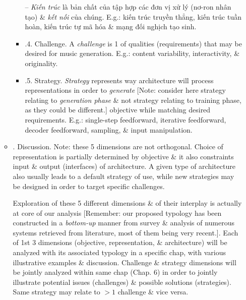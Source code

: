 \documentclass{article}
\begin{document}
\begin{itemize}
\begin{itemize}
\begin{itemize}
			-- {\it Kiến trúc} là bản chất của tập hợp các đơn vị xử lý {\it} (nơ-ron nhân tạo) \& {\it kết nối} của chúng. E.g.: kiến trúc truyền thẳng, kiến trúc tuần hoàn, kiến trúc tự mã hóa \& mạng đối nghịch tạo sinh.
			\item {.4. Challenge.} A {\it challenge} is 1 of qualities (requirements) that may be desired for music generation. E.g.: content variability, interactivity, \& originality.
			\item {.5. Strategy.} {\it Strategy} represents way architecture will process representations in order to {\it generate} [Note: consider here strategy relating to {\it generation phase} \& not strategy relating to training phase, as they could be different.] objective while matching desired requirements. E.g.: single-step feedforward, iterative feedforward, decoder feedforward, sampling, \& input manipulation.
		\end{itemize}
		\item {. Discussion.} Note: these 5 dimensions are not orthogonal. Choice of representation is partially determined by objective \& it also constraints input \& output (interfaces) of architecture. A given type of architecture also usually leads to a default strategy of use, while new strategies may be designed in order to target specific challenges.
		
		Exploration of these 5 different dimensions \& of their interplay is actually at core of our analysis [Remember: our proposed typology has been constructed in a {\it bottom-up} manner from survey \& analysis of numerous systems retrieved from literature, most of them being very recent.]. Each of 1st 3 dimensions (objective, representation, \& architecture) will be analyzed with its associated typology in a specific chap, with various illustrative examples \& discussion. Challenge \& strategy dimensions will be jointly analyzed within same chap (Chap. 6) in order to jointly illustrate potential issues (challenges) \& possible solutions (strategies). Same strategy may relate to $> 1$ challenge \& vice versa.
		

\end{itemize}
\end{itemize}
\end{document}
